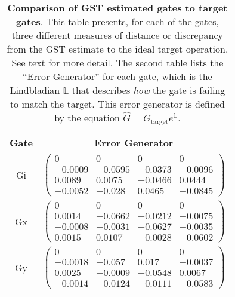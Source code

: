 \documentclass{article}[11pt]
\begin{document}
\begin{table}[h]
\begin{center}
\vspace{2em}
\begin{tabular}[l]{|c|c|}
\hline
Gate & Error Generator \\ \hline
Gi & $ \left(\!\!\begin{array}{cccc}
0 & 0 & 0 & 0 \\ 
-0.0009 & -0.0595 & -0.0373 & -0.0096 \\ 
0.0089 & 0.0075 & -0.0466 & 0.0444 \\ 
-0.0052 & -0.028 & 0.0465 & -0.0845
 \end{array}\!\!\right) $
 \\ \hline
Gx & $ \left(\!\!\begin{array}{cccc}
0 & 0 & 0 & 0 \\ 
0.0014 & -0.0662 & -0.0212 & -0.0075 \\ 
-0.0008 & -0.0031 & -0.0627 & -0.0035 \\ 
0.0015 & 0.0107 & -0.0028 & -0.0602
 \end{array}\!\!\right) $
 \\ \hline
Gy & $ \left(\!\!\begin{array}{cccc}
0 & 0 & 0 & 0 \\ 
-0.0018 & -0.057 & 0.017 & -0.0037 \\ 
0.0025 & -0.0009 & -0.0548 & 0.0067 \\ 
-0.0014 & -0.0124 & -0.0111 & -0.0583
 \end{array}\!\!\right) $
 \\ \hline
\end{tabular}

\caption{\textbf{Comparison of GST estimated gates to target gates}.  This table presents, for each of the gates, three different measures of distance or discrepancy from the GST estimate to the ideal target operation.  See text for more detail.  The second table lists the ``Error Generator'' for each gate, which is the Lindbladian $\mathbb{L}$ that describes \emph{how} the gate is failing to match the target.  This error generator is defined by the equation $\hat{G} = G_{\mathrm{target}}e^{\mathbb{L}}$. \label{bestGatesetVsTargetTable}}
\end{center}
\end{table}
\end{document}
